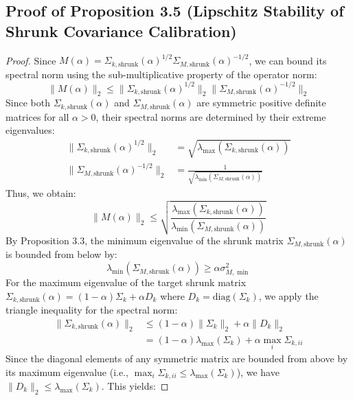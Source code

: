 \documentclass{article}
\theoremstyle{plain}
\theoremstyle{definition}
\theoremstyle{remark}
\begin{document}
\subsection{Proof of Proposition 3.5 (Lipschitz Stability of Shrunk Covariance Calibration)}
\label{sec:proofs_lipschitz_stability}
\begin{proof}
Since $M(\alpha) = \Sigma_{k,\text{shrunk}}(\alpha)^{1/2} \Sigma_{M,\text{shrunk}}(\alpha)^{-1/2}$, we can bound its spectral norm using the sub-multiplicative property of the operator norm:
\begin{equation*}
  \| M(\alpha) \|_2 \leq \big\| \Sigma_{k,\text{shrunk}}(\alpha)^{1/2} \big\|_2 \big\| \Sigma_{M,\text{shrunk}}(\alpha)^{-1/2} \big\|_2
\end{equation*}
Since both $\Sigma_{k,\text{shrunk}}(\alpha)$ and $\Sigma_{M,\text{shrunk}}(\alpha)$ are symmetric positive definite matrices for all $\alpha > 0$, their spectral norms are determined by their extreme eigenvalues:
\begin{align*}
  \big\| \Sigma_{k,\text{shrunk}}(\alpha)^{1/2} \big\|_2 &= \sqrt{\lambda_{\max}\left(\Sigma_{k,\text{shrunk}}(\alpha)\right)} \\
  \big\| \Sigma_{M,\text{shrunk}}(\alpha)^{-1/2} \big\|_2 &= \frac{1}{\sqrt{\lambda_{\min}\left(\Sigma_{M,\text{shrunk}}(\alpha)\right)}}
\end{align*}
Thus, we obtain:
\begin{equation}
  \| M(\alpha) \|_2 \leq \sqrt{ \frac{\lambda_{\max}\left(\Sigma_{k,\text{shrunk}}(\alpha)\right)}{\lambda_{\min}\left(\Sigma_{M,\text{shrunk}}(\alpha)\right)} }
\end{equation}
By Proposition 3.3, the minimum eigenvalue of the shrunk matrix $\Sigma_{M,\text{shrunk}}(\alpha)$ is bounded from below by:
\begin{equation*}
  \lambda_{\min}\left(\Sigma_{M,\text{shrunk}}(\alpha)\right) \geq \alpha \sigma_{M,\min}^2
\end{equation*}
For the maximum eigenvalue of the target shrunk matrix $\Sigma_{k,\text{shrunk}}(\alpha) = (1 - \alpha)\Sigma_k + \alpha D_k$ where $D_k = \text{diag}(\Sigma_k)$, we apply the triangle inequality for the spectral norm:
\begin{align*}
  \big\| \Sigma_{k,\text{shrunk}}(\alpha) \big\|_2 &\leq (1 - \alpha) \|\Sigma_k\|_2 + \alpha \|D_k\|_2 \\
  &= (1 - \alpha) \lambda_{\max}(\Sigma_k) + \alpha \max_{i} \Sigma_{k,ii}
\end{align*}
Since the diagonal elements of any symmetric matrix are bounded from above by its maximum eigenvalue (i.e., $\max_i \Sigma_{k,ii} \leq \lambda_{\max}(\Sigma_k)$), we have $\|D_k\|_2 \leq \lambda_{\max}(\Sigma_k)$. This yields:

\end{proof}
\end{document}
